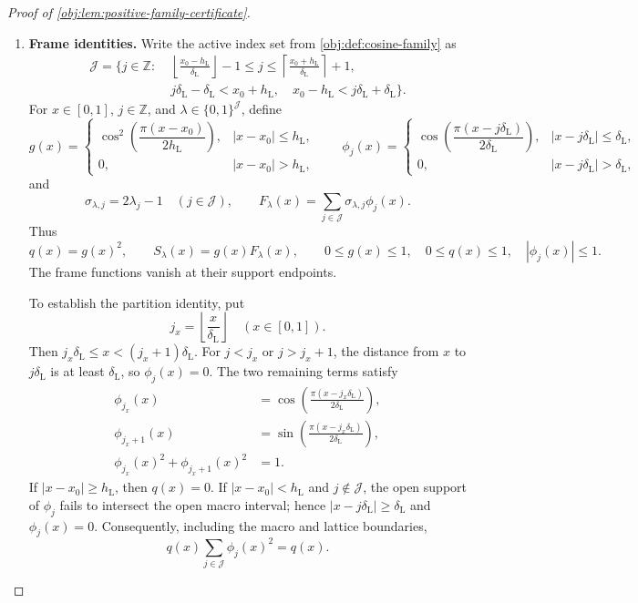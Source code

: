 \documentclass[11pt]{article}
\begin{document}
\begin{proof}[Proof of \cref{obj:lem:positive-family-certificate}]
\begin{enumerate}
\item \textbf{Frame identities.}
Write the active index set from \cref{obj:def:cosine-family} as
\[
\begin{split}
\mathcal J=\biggl\{j\in\mathbb Z:\;&
\left\lfloor\frac{x_0-h_{\mathrm L}}{\delta_{\mathrm L}}\right\rfloor-1
\le j\le
\left\lceil\frac{x_0+h_{\mathrm L}}{\delta_{\mathrm L}}\right\rceil+1,\\
&j\delta_{\mathrm L}-\delta_{\mathrm L}<x_0+h_{\mathrm L},
\quad
x_0-h_{\mathrm L}<j\delta_{\mathrm L}+\delta_{\mathrm L}
\biggr\}.
\end{split}
\]
For \(x\in[0,1]\), \(j\in\mathbb Z\), and
\(\lambda\in\{0,1\}^{\mathcal J}\), define
\[
g(x)=
\begin{cases}
\cos^2\!\left(\dfrac{\pi(x-x_0)}{2h_{\mathrm L}}\right),
 & |x-x_0|\le h_{\mathrm L},\\
0,& |x-x_0|>h_{\mathrm L},
\end{cases}
\qquad
\phi_j(x)=
\begin{cases}
\cos\!\left(\dfrac{\pi(x-j\delta_{\mathrm L})}{2\delta_{\mathrm L}}\right),
 & |x-j\delta_{\mathrm L}|\le\delta_{\mathrm L},\\
0,& |x-j\delta_{\mathrm L}|>\delta_{\mathrm L},
\end{cases}
\]
and
\[
\sigma_{\lambda,j}=2\lambda_j-1\quad(j\in\mathcal J),
\qquad
F_\lambda(x)=\sum_{j\in\mathcal J}\sigma_{\lambda,j}\phi_j(x).
\]
Thus
\[
q(x)=g(x)^2,\qquad S_\lambda(x)=g(x)F_\lambda(x),
\qquad
0\le g(x)\le1,\quad 0\le q(x)\le1,\quad |\phi_j(x)|\le1.
\]
The frame functions vanish at their support endpoints.

To establish the partition identity, put
\[
j_x=\left\lfloor\frac{x}{\delta_{\mathrm L}}\right\rfloor
\quad(x\in[0,1]).
\]
Then \(j_x\delta_{\mathrm L}\le x<(j_x+1)\delta_{\mathrm L}\).
For \(j<j_x\) or \(j>j_x+1\), the distance from \(x\) to
\(j\delta_{\mathrm L}\) is at least \(\delta_{\mathrm L}\), so
\(\phi_j(x)=0\). The two remaining terms satisfy
\[
\begin{aligned}
\phi_{j_x}(x)
 &=\cos\!\left(\frac{\pi(x-j_x\delta_{\mathrm L})}
                         {2\delta_{\mathrm L}}\right),\\
\phi_{j_x+1}(x)
 &=\sin\!\left(\frac{\pi(x-j_x\delta_{\mathrm L})}
                         {2\delta_{\mathrm L}}\right),\\
\phi_{j_x}(x)^2+\phi_{j_x+1}(x)^2&=1.
\end{aligned}
\]
If \(|x-x_0|\ge h_{\mathrm L}\), then \(q(x)=0\).
If \(|x-x_0|<h_{\mathrm L}\) and \(j\notin\mathcal J\), the
open support of \(\phi_j\) fails to intersect the open macro interval;
hence \(|x-j\delta_{\mathrm L}|\ge\delta_{\mathrm L}\) and
\(\phi_j(x)=0\). Consequently, including the macro and lattice
boundaries,
\[
q(x)\sum_{j\in\mathcal J}\phi_j(x)^2=q(x).
\]


\end{enumerate}
\end{proof}
\end{document}
